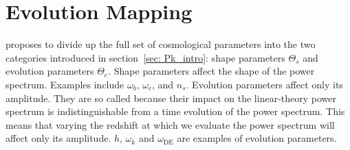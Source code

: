 \begin{comment}

\section{Monte Carlo Markov Chains}




This can be a very brief section, but I want to discuss a little bit of how most modern parameter inference works because it motivates the need for extremely fast power spectrum computation. It provides a sort of conceptual bridge between our ``pure'' goal (quantifying the cosmos) and the nitty-gritty bulk of the paper (optimizing emulator performance).

Metropolis-Hastings algorithm.

We don't know what the true probability distribution of power spectra is. In order to build this distribution with simulation results, we simply draw from the distribution. \textcolor{orange}{Refer to ``Data to Insights'' lecture notes in order to tighten this description.}

\end{comment}

\section{Evolution Mapping}
\label{sec: ev_mapping_intro}

\citet{San21} proposes to divide up the full set of cosmological
parameters into the two categories introduced in section~\ref{sec: Pk_intro}: 
shape parameters $\Theta_s$ and evolution parameters $\Theta_e$.
Shape parameters affect the shape of the power spectrum. Examples include
$\omega_b$, $\omega_c$, and $n_s$.
Evolution parameters affect only its amplitude. They are so called because
their impact on the linear-theory power spectrum is 
indistinguishable from a time evolution of the power 
spectrum. This means that varying the redshift at which we evaluate the power
spectrum will affect only its amplitude. $h$, $\omega_k$ and
$\omega_\text{DE}$ are examples of evolution parameters. 

